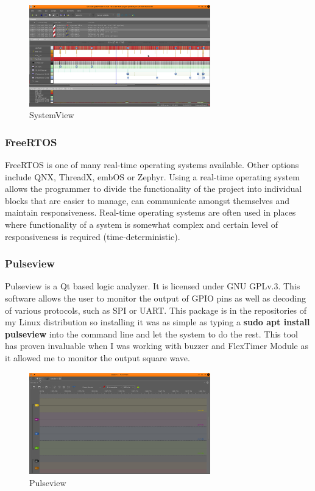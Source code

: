 \documentclass[12pt,a4paper]{article}
\begin{document}
		\begin{figure}[h]
			\centering
			\includegraphics[width=0.7\textwidth]{systemview1}
			\caption{SystemView}
		\end{figure}
	
		\subsubsection{FreeRTOS}
		FreeRTOS is one of many real-time operating systems available. Other options include QNX, 
		ThreadX, embOS or Zephyr. Using a real-time operating system allows the programmer to 
		divide the functionality of the project into individual blocks that are easier to manage, 
		can communicate amongst themselves and maintain responsiveness. Real-time operating
		systems are often used in places where functionality of a system is somewhat complex and 
		certain level of responsiveness is required (time-deterministic).
		
		\subsubsection{Pulseview}
		Pulseview is a Qt based logic analyzer. It is licensed under GNU GPLv.3. This software  
		allows the user to monitor the output of GPIO pins as well as decoding of various protocols,
		such as SPI or UART. This package is in the repositories of my Linux distribution so 
		installing it was as simple as typing a {\bfseries sudo apt install pulseview} into the command line and let the system to do the rest. This tool has proven invaluable when 
		I was working with buzzer and FlexTimer Module as it allowed me to monitor the output
		square wave.
		
		\begin{figure}[h]
			\centering
			\includegraphics[width=0.7\textwidth]{pulseview}
			\caption{Pulseview}
		\end{figure}
	
\end{document}
